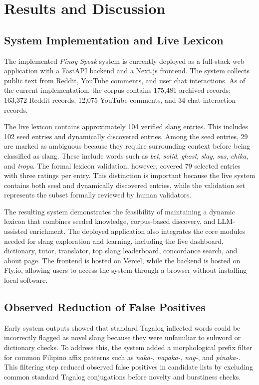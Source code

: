 \section{Results and Discussion}

\subsection{System Implementation and Live Lexicon}
The implemented \textit{Pinoy Speak} system is currently deployed as a full-stack web application with a FastAPI backend and a Next.js frontend. The system collects public text from Reddit, YouTube comments, and user chat interactions. As of the current implementation, the corpus contains 175,481 archived records: 163,372 Reddit records, 12,075 YouTube comments, and 34 chat interaction records.

The live lexicon contains approximately 104 verified slang entries. This includes 102 seed entries and dynamically discovered entries. Among the seed entries, 29 are marked as ambiguous because they require surrounding context before being classified as slang. These include words such as \textit{bet}, \textit{solid}, \textit{ghost}, \textit{slay}, \textit{sus}, \textit{chika}, and \textit{tropa}. The formal lexicon validation, however, covered 79 selected entries with three ratings per entry. This distinction is important because the live system contains both seed and dynamically discovered entries, while the validation set represents the subset formally reviewed by human validators.

The resulting system demonstrates the feasibility of maintaining a dynamic lexicon that combines seeded knowledge, corpus-based discovery, and LLM-assisted enrichment. The deployed application also integrates the core modules needed for slang exploration and learning, including the live dashboard, dictionary, tutor, translator, top slang leaderboard, concordance search, and about page. The frontend is hosted on Vercel, while the backend is hosted on Fly.io, allowing users to access the system through a browser without installing local software.

\subsection{Observed Reduction of False Positives}
Early system outputs showed that standard Tagalog inflected words could be incorrectly flagged as novel slang because they were unfamiliar to subword or dictionary checks. To address this, the system added a morphological prefix filter for common Filipino affix patterns such as \textit{naka-}, \textit{napaka-}, \textit{nag-}, and \textit{pinaka-}. This filtering step reduced observed false positives in candidate lists by excluding common standard Tagalog conjugations before novelty and burstiness checks.

